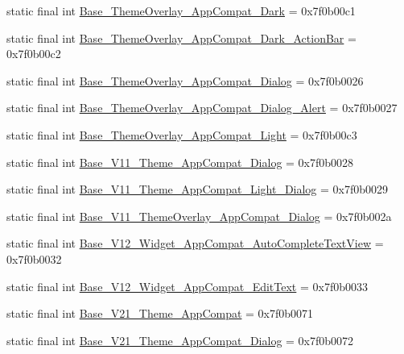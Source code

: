 \begin{CompactItemize}
static final int \hyperlink{classandroid_1_1support_1_1graphics_1_1drawable_1_1_r_1_1style_a83334f725330b57ecf787efee1b625c}{Base\_\-ThemeOverlay\_\-AppCompat\_\-Dark} = 0x7f0b00c1
\item 
static final int \hyperlink{classandroid_1_1support_1_1graphics_1_1drawable_1_1_r_1_1style_930c854002d6f2a1fe5ae1deb7096b12}{Base\_\-ThemeOverlay\_\-AppCompat\_\-Dark\_\-ActionBar} = 0x7f0b00c2
\item 
static final int \hyperlink{classandroid_1_1support_1_1graphics_1_1drawable_1_1_r_1_1style_06e3c005710fd29a308cd851714d2ca6}{Base\_\-ThemeOverlay\_\-AppCompat\_\-Dialog} = 0x7f0b0026
\item 
static final int \hyperlink{classandroid_1_1support_1_1graphics_1_1drawable_1_1_r_1_1style_a77fa9ad934e959efc64df1bd68ed737}{Base\_\-ThemeOverlay\_\-AppCompat\_\-Dialog\_\-Alert} = 0x7f0b0027
\item 
static final int \hyperlink{classandroid_1_1support_1_1graphics_1_1drawable_1_1_r_1_1style_24b58bb6c8504839e92efc98fe8e65d7}{Base\_\-ThemeOverlay\_\-AppCompat\_\-Light} = 0x7f0b00c3
\item 
static final int \hyperlink{classandroid_1_1support_1_1graphics_1_1drawable_1_1_r_1_1style_6e456f5e6195169923329c11273778dd}{Base\_\-V11\_\-Theme\_\-AppCompat\_\-Dialog} = 0x7f0b0028
\item 
static final int \hyperlink{classandroid_1_1support_1_1graphics_1_1drawable_1_1_r_1_1style_e9c2d1918deb615144d4d293f5c678b6}{Base\_\-V11\_\-Theme\_\-AppCompat\_\-Light\_\-Dialog} = 0x7f0b0029
\item 
static final int \hyperlink{classandroid_1_1support_1_1graphics_1_1drawable_1_1_r_1_1style_20860ceadfe02f160d57c72347e63223}{Base\_\-V11\_\-ThemeOverlay\_\-AppCompat\_\-Dialog} = 0x7f0b002a
\item 
static final int \hyperlink{classandroid_1_1support_1_1graphics_1_1drawable_1_1_r_1_1style_26c47d8fe1ab8dc8e7d8813200b7dd53}{Base\_\-V12\_\-Widget\_\-AppCompat\_\-AutoCompleteTextView} = 0x7f0b0032
\item 
static final int \hyperlink{classandroid_1_1support_1_1graphics_1_1drawable_1_1_r_1_1style_15a02957d761a0d3055ae4a7ca864010}{Base\_\-V12\_\-Widget\_\-AppCompat\_\-EditText} = 0x7f0b0033
\item 
static final int \hyperlink{classandroid_1_1support_1_1graphics_1_1drawable_1_1_r_1_1style_3cb0e876af3cfbb7c6bcebd5d297851e}{Base\_\-V21\_\-Theme\_\-AppCompat} = 0x7f0b0071
\item 
static final int \hyperlink{classandroid_1_1support_1_1graphics_1_1drawable_1_1_r_1_1style_3d9adc05b62f1e71802726bb8c8490c3}{Base\_\-V21\_\-Theme\_\-AppCompat\_\-Dialog} = 0x7f0b0072

\end{CompactItemize}
